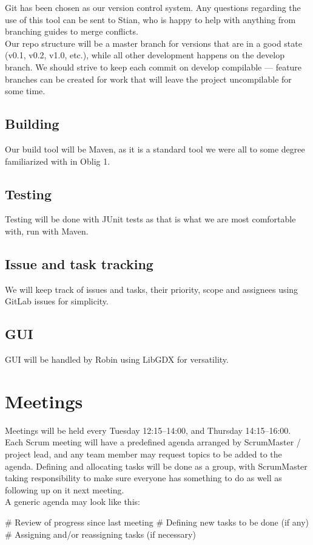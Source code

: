 \documentclass{article}
\begin{document}
Git has been chosen as our version control system. Any questions regarding the use of this tool can be sent to Stian, who is happy to help with anything from branching guides to merge conflicts.\\

Our repo structure will be a master branch for versions that are in a good state (v0.1, v0.2, v1.0, etc.), while all other development happens on the develop branch. We should strive to keep each commit on develop compilable --- feature branches can be created for work that will leave the project uncompilable for some time.

\subsection*{Building}

Our build tool will be Maven, as it is a standard tool we were all to some degree familiarized with in Oblig 1.

\subsection*{Testing}

Testing will be done with JUnit tests as that is what we are most comfortable with, run with Maven.

\subsection*{Issue and task tracking}

We will keep track of issues and tasks, their priority, scope and assignees using GitLab issues for simplicity.

\subsection*{GUI}

GUI will be handled by Robin using LibGDX for versatility.

\section*{Meetings}

Meetings will be held every Tuesday 12:15--14:00, and Thursday 14:15--16:00. Each Scrum meeting will have a predefined agenda arranged by ScrumMaster / project lead, and any team member may request topics to be added to the agenda. Defining and allocating tasks will be done as a group, with ScrumMaster taking responsibility to make sure everyone has something to do as well as following up on it next meeting.\\

A generic agenda may look like this:\\

\begin{easylist}[enumerate]
    # Review of progress since last meeting
    # Defining new tasks to be done (if any)
    # Assigning and/or reassigning tasks (if necessary)
\end{easylist}
\end{document}

